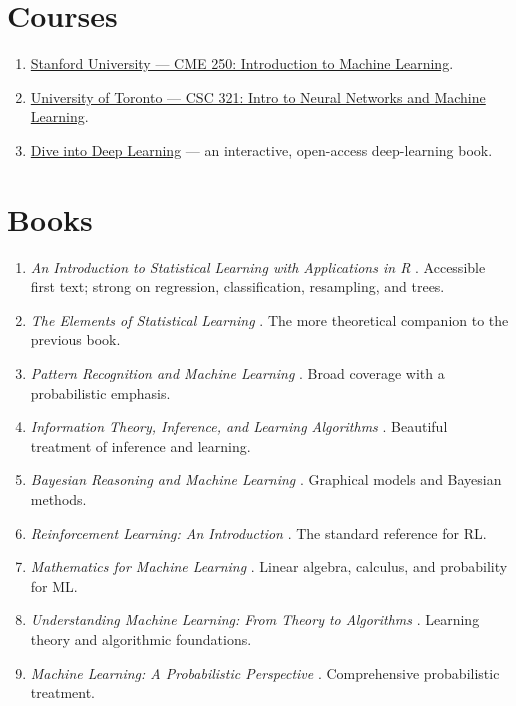 \documentclass[a4paper, 12pt]{book}
\begin{document}
\section{Courses}

\begin{enumerate}
    \item \href{https://web.stanford.edu/class/cme250/}{Stanford University --- CME 250:
    Introduction to Machine Learning}.
    \item \href{https://www.cs.toronto.edu/~rgrosse/courses/csc321_2018/}{University of
    Toronto --- CSC 321: Intro to Neural Networks and Machine Learning}.
    \item \href{https://www.d2l.ai/}{Dive into Deep Learning} --- an interactive,
    open-access deep-learning book.
\end{enumerate}

\section{Books}

\begin{enumerate}
    \item \emph{An Introduction to Statistical Learning with Applications in R}
    \cite{james2021introduction}. Accessible first text; strong on regression,
    classification, resampling, and trees.
    \item \emph{The Elements of Statistical Learning}
    \cite{hastie2009elements}. The more theoretical companion to the previous book.
    \item \emph{Pattern Recognition and Machine Learning}
    \cite{theodoridis2006pattern}. Broad coverage with a probabilistic emphasis.
    \item \emph{Information Theory, Inference, and Learning Algorithms}
    \cite{mackay2003information}. Beautiful treatment of inference and learning.
    \item \emph{Bayesian Reasoning and Machine Learning}
    \cite{barber2012bayesian}. Graphical models and Bayesian methods.
    \item \emph{Reinforcement Learning: An Introduction}
    \cite{sutton1998reinforcement}. The standard reference for RL.
    \item \emph{Mathematics for Machine Learning}
    \cite{deisenroth2020mathematics}. Linear algebra, calculus, and probability for ML.
    \item \emph{Understanding Machine Learning: From Theory to Algorithms}
    \cite{shalev2014understanding}. Learning theory and algorithmic foundations.
    \item \emph{Machine Learning: A Probabilistic Perspective}
    \cite{murphy2012machine}. Comprehensive probabilistic treatment.
\end{enumerate}
\end{document}
